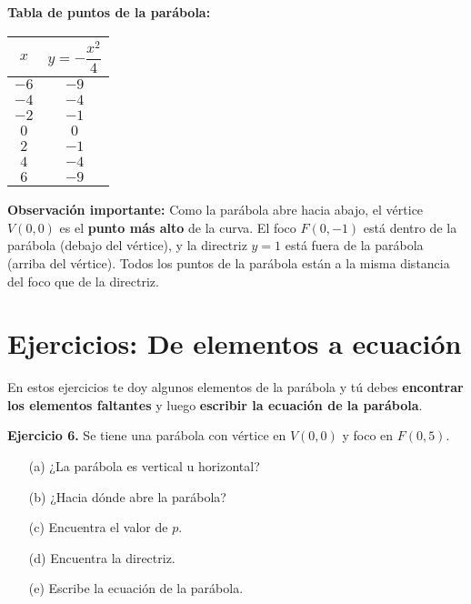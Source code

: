 \documentclass[12pt,a4paper]{article}
\begin{document}
	\bigskip

	\textbf{Tabla de puntos de la parábola:}

	\begin{center}
		\begin{tabular}{|c|c|}
			\hline
			\(x\) & \(y=-\dfrac{x^2}{4}\) \\
			\hline
			\(-6\) & \(-9\) \\
			\hline
			\(-4\) & \(-4\) \\
			\hline
			\(-2\) & \(-1\) \\
			\hline
			\(0\) & \(0\) \\
			\hline
			\(2\) & \(-1\) \\
			\hline
			\(4\) & \(-4\) \\
			\hline
			\(6\) & \(-9\) \\
			\hline
		\end{tabular}
	\end{center}

	\bigskip

	\textbf{Observación importante:} Como la parábola abre hacia abajo, el vértice \(V(0,0)\) es el \textbf{punto más alto} de la curva. El foco \(F(0,-1)\) está dentro de la parábola (debajo del vértice), y la directriz \(y=1\) está fuera de la parábola (arriba del vértice). Todos los puntos de la parábola están a la misma distancia del foco que de la directriz.

	\newpage

	\section{Ejercicios: De elementos a ecuación}

	En estos ejercicios te doy algunos elementos de la parábola y tú debes \textbf{encontrar los elementos faltantes} y luego \textbf{escribir la ecuación de la parábola}.

	\bigskip

	\textbf{Ejercicio 6.} Se tiene una parábola con vértice en \(V(0,0)\) y foco en \(F(0,5)\).
	\begin{itemize}
		\item[(a)] ¿La parábola es vertical u horizontal?
		\item[(b)] ¿Hacia dónde abre la parábola?
		\item[(c)] Encuentra el valor de \(p\).
		\item[(d)] Encuentra la directriz.
		\item[(e)] Escribe la ecuación de la parábola.
	\end{itemize}
\end{document}

